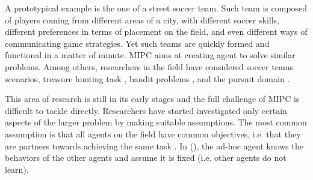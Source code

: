 A prototypical example is the one of a street soccer team. Such team is composed of players coming from different areas of a city, with different soccer skills, different preferences in terms of placement on the field, and even different ways of communicating game strategies. Yet such teams are quickly formed and functional in a matter of minute. MIPC aims at creating agent to solve similar problems. Among others, researchers in the field have considered soccer teams scenarios\cite{bowling2005coordination}, treasure hunting task \cite{gil2006dynamically}, bandit problems \cite{barrett2013communicating}, and the pursuit domain \cite{barrett2011empirical}.

This area of research is still in its early stages and the full challenge of MIPC is difficult to tackle directly. Researchers have started investigated only certain aspects of the larger problem by making suitable assumptions. The most common assumption is that all agents on the field have common objectives, i.e. that they are partners towards achieving the same task \cite{barrett2011empirical}.  In (\cite{stone2010teach,stone2013teaching}), the ad-hoc agent knows the behaviors of the other agents and assume it is fixed (i.e. other agents do not learn). 

